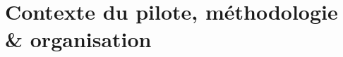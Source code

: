 \chapter{Contexte du pilote, méthodologie \& organisation}
\label{chap:context}
\setlength{\parindent}{0pt}















